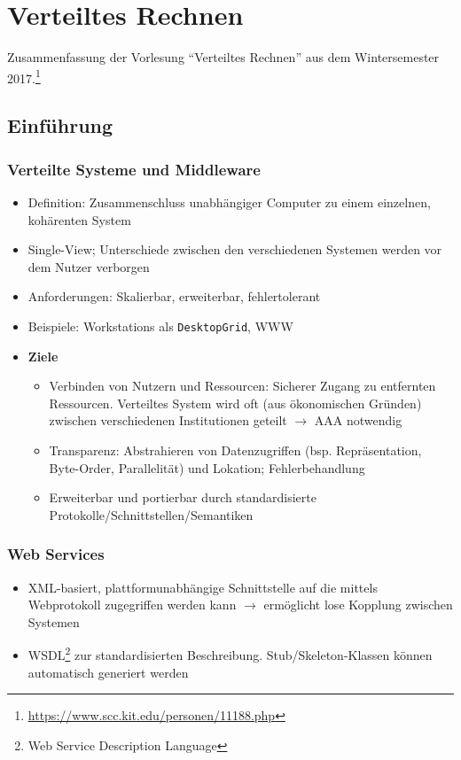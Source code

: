 \chapter{Verteiltes Rechnen}

Zusammenfassung der Vorlesung "`Verteiltes Rechnen"' aus dem Wintersemester 2017.\footnote{\url{https://www.scc.kit.edu/personen/11188.php}}

\section{Einführung}

\subsection{Verteilte Systeme und Middleware}
\begin{itemize}
	\item Definition: Zusammenschluss unabhängiger Computer zu einem einzelnen, kohärenten System
	\item Single-View; Unterschiede zwischen den verschiedenen Systemen werden vor dem Nutzer verborgen
	\item Anforderungen: Skalierbar, erweiterbar, fehlertolerant
	\item Beispiele: Workstations als \texttt{DesktopGrid}, WWW
	\item \textbf{Ziele}
	\begin{itemize}
		\item Verbinden von Nutzern und Ressourcen: Sicherer Zugang zu entfernten Ressourcen. Verteiltes System wird oft (aus ökonomischen Gründen) zwischen verschiedenen Institutionen geteilt \(\rightarrow\) AAA notwendig
		\item Transparenz: Abstrahieren von Datenzugriffen (bsp. Repräsentation, Byte-Order, Parallelität) und Lokation; Fehlerbehandlung
		\item Erweiterbar und portierbar durch standardisierte Protokolle/Schnittstellen/Semantiken
	\end{itemize}
\end{itemize}


\subsection{Web Services}
\begin{itemize}
	\item XML-basiert, plattformunabhängige Schnittstelle auf die mittels Webprotokoll zugegriffen werden kann \(\rightarrow\) ermöglicht lose Kopplung zwischen Systemen
	\item WSDL\footnote{Web Service Description Language} zur standardisierten Beschreibung. Stub/Skeleton-Klassen können automatisch generiert werden
\end{itemize}


